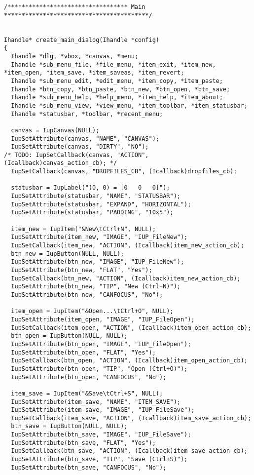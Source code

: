 \documentclass{ctexart}
\begin{document}
\begin{lstlisting}
/********************************** Main *****************************************/


Ihandle* create_main_dialog(Ihandle *config)
{
  Ihandle *dlg, *vbox, *canvas, *menu;
  Ihandle *sub_menu_file, *file_menu, *item_exit, *item_new, *item_open, *item_save, *item_saveas, *item_revert;
  Ihandle *sub_menu_edit, *edit_menu, *item_copy, *item_paste;
  Ihandle *btn_copy, *btn_paste, *btn_new, *btn_open, *btn_save;
  Ihandle *sub_menu_help, *help_menu, *item_help, *item_about;
  Ihandle *sub_menu_view, *view_menu, *item_toolbar, *item_statusbar;
  Ihandle *statusbar, *toolbar, *recent_menu;

  canvas = IupCanvas(NULL);
  IupSetAttribute(canvas, "NAME", "CANVAS");
  IupSetAttribute(canvas, "DIRTY", "NO");
/* TODO: IupSetCallback(canvas, "ACTION", (Icallback)canvas_action_cb); */
  IupSetCallback(canvas, "DROPFILES_CB", (Icallback)dropfiles_cb);

  statusbar = IupLabel("(0, 0) = [0   0   0]");
  IupSetAttribute(statusbar, "NAME", "STATUSBAR");
  IupSetAttribute(statusbar, "EXPAND", "HORIZONTAL");
  IupSetAttribute(statusbar, "PADDING", "10x5");

  item_new = IupItem("&New\tCtrl+N", NULL);
  IupSetAttribute(item_new, "IMAGE", "IUP_FileNew");
  IupSetCallback(item_new, "ACTION", (Icallback)item_new_action_cb);
  btn_new = IupButton(NULL, NULL);
  IupSetAttribute(btn_new, "IMAGE", "IUP_FileNew");
  IupSetAttribute(btn_new, "FLAT", "Yes");
  IupSetCallback(btn_new, "ACTION", (Icallback)item_new_action_cb);
  IupSetAttribute(btn_new, "TIP", "New (Ctrl+N)");
  IupSetAttribute(btn_new, "CANFOCUS", "No");

  item_open = IupItem("&Open...\tCtrl+O", NULL);
  IupSetAttribute(item_open, "IMAGE", "IUP_FileOpen");
  IupSetCallback(item_open, "ACTION", (Icallback)item_open_action_cb);
  btn_open = IupButton(NULL, NULL);
  IupSetAttribute(btn_open, "IMAGE", "IUP_FileOpen");
  IupSetAttribute(btn_open, "FLAT", "Yes");
  IupSetCallback(btn_open, "ACTION", (Icallback)item_open_action_cb);
  IupSetAttribute(btn_open, "TIP", "Open (Ctrl+O)");
  IupSetAttribute(btn_open, "CANFOCUS", "No");

  item_save = IupItem("&Save\tCtrl+S", NULL);
  IupSetAttribute(item_save, "NAME", "ITEM_SAVE");
  IupSetAttribute(item_save, "IMAGE", "IUP_FileSave");
  IupSetCallback(item_save, "ACTION", (Icallback)item_save_action_cb);
  btn_save = IupButton(NULL, NULL);
  IupSetAttribute(btn_save, "IMAGE", "IUP_FileSave");
  IupSetAttribute(btn_save, "FLAT", "Yes");
  IupSetCallback(btn_save, "ACTION", (Icallback)item_save_action_cb);
  IupSetAttribute(btn_save, "TIP", "Save (Ctrl+S)");
  IupSetAttribute(btn_save, "CANFOCUS", "No");


\end{lstlisting}
\end{document}
